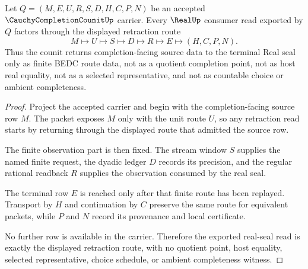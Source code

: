 \begin{theorem}
\label{thm:cauchy-completion-counit-real-seal-retraction}
Let $Q=(M,E,U,R,S,D,H,C,P,N)$ be an accepted $\CauchyCompletionCounitUp$ carrier. Every $\RealUp$ consumer read exported by $Q$ factors through the displayed retraction route
$$
M\longmapsto U\longmapsto S\longmapsto D\longmapsto R\longmapsto E\longmapsto(H,C,P,N).
$$
Thus the counit returns completion-facing source data to the terminal Real seal only as finite BEDC route data, not as a quotient completion point, not as host real equality, not as a selected representative, and not as countable choice or ambient completeness.
\end{theorem}
\begin{proof}
Project the accepted carrier and begin with the completion-facing source row $M$. The packet exposes $M$ only with the unit route $U$, so any retraction read starts by returning through the displayed route that admitted the source row.

The finite observation part is then fixed. The stream window $S$ supplies the named finite request, the dyadic ledger $D$ records its precision, and the regular rational readback $R$ supplies the observation consumed by the real seal.

The terminal row $E$ is reached only after that finite route has been replayed. Transport by $H$ and continuation by $C$ preserve the same route for equivalent packets, while $P$ and $N$ record its provenance and local certificate.

No further row is available in the carrier. Therefore the exported real-seal read is exactly the displayed retraction route, with no quotient point, host equality, selected representative, choice schedule, or ambient completeness witness.
\end{proof}

